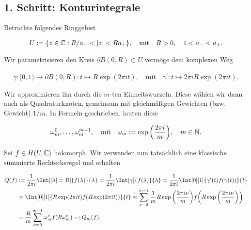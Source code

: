 \subsection*{1. Schritt: Konturintegrale}

Betrachte folgendes Ringgebiet

\begin{align*}
    U := {\left \{ z \in \mathbb{C}: R / a_- < |z| < R a_+ \right \}},
    \quad
    \text{mit}
    \quad
    R > 0,
    \quad
    1 < a_- < a_+.
\end{align*}

Wir parametrisieren den Kreis $\partial B(0, R) \subset U$ vermöge dem komplexen Weg

\begin{align*}
    \gamma: [0, 1) \to \partial B(0, R): t \mapsto R \exp(2 \pi i t),
    \quad
    \text{mit}
    \quad
    \gamma^\prime: t \mapsto 2 \pi i R \exp(2 \pi i t).
\end{align*}

Wir approximieren ihn durch die $m$-ten Einheitswurzeln.
Diese wählen wir dann auch als Quadraturknoten, gemeinsam mit gleichmäßigen Gewichten (bzw. Gewicht) $1 / m$.
In Formeln geschrieben, lauten diese

\begin{align*}
    \omega_m^0, \dots, \omega_m^{m - 1},
    \quad
    \text{mit}
    \quad
    \omega_m := \exp {\left ( \frac{2 \pi i}{m} \right )},
    \quad
    m \in \mathbb{N}.
\end{align*}

Sei $f \in H(U, \mathbb{C})$ holomorph.
Wir verwenden nun tatsächlich eine klassische summierte Rechtecksregel und erhalten

\begin{align*}
    Q(f)
    & :=
    \frac{1}{2 \pi i}
    \Int[|\lambda| = R]
    {
        f(\lambda)
    }{\lambda}
    =
    \frac{1}{2 \pi i}
    \Int[\gamma]
    {
        f(\lambda)
    }{\lambda}
    =
    \frac{1}{2 \pi i}
    \Int[0][1]
    {
        \gamma^\prime(t)
        f(\gamma(t))
    }{t} \\
    & =
    \Int[0][1]
    {
        R
        \exp(2 \pi i t)
        f(R \exp(2 \pi i t))
    }{t}
    \stackrel{!}{\approx}
    \sum_{\nu = 0}^{m-1}
        \frac{1}{m}
        R \exp \pbraces{\frac{2 \pi i \nu}{m}}
        f
        \pbraces
        {
            R \exp \pbraces{\frac{2 \pi i \nu}{m}}
        } \\
    & =
    \frac{R}{m}
    \sum_{\nu = 0}^{m-1}
        \omega_m^\nu
        f(R \omega_m^\nu)
    =:
    Q_m(f).
\end{align*}

